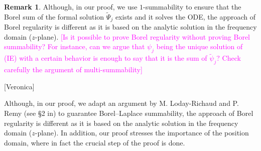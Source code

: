 \documentclass{article}
\theoremstyle{definition}
\newcommand{\series}[1]{\tilde{#1}}
\newtheorem{remark}[definition]{Remark}
\begin{document}
\color{Tan}
\begin{remark}
Although, in our proof, we use $1$-summability to ensure that the Borel sum of the formal solution $\series{\Psi}_j$ exists and it solves the ODE, the approach of Borel regularity is different as it is based on the analytic solution in the frequency domain ($z$-plane). \textcolor{magenta}{[Is it possible to prove Borel regularity without proving Borel summability? For instance, can we argue that $\psi_j$ being the unique solution of (IE) with a certain behavior is enough to say that it is the sum of $\series{\psi}_j$? Check carefully the argument of multi-summability]} 
\end{remark}

\color{magenta}
[Veronica]

Although, in our proof, we adapt an argument by M. Loday-Richaud and P. Remy (see \S 2 in\cite{loday-Remy2011}) to guarantee Borel--Laplace summability, the approach of Borel regularity is different as it is based on the analytic solution in the frequency domain ($z$-plane). In addition, our proof stresses the importance of the position domain, where in fact the crucial step of the proof is done. 

\end{document}
